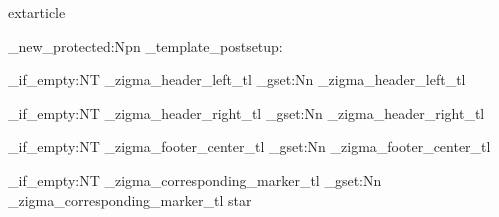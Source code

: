 
\ExplSyntaxOff


\def\@tempa{extarticle}
\ifx\zigma@baseclass\@tempa
  \def\zigma@baseclass{article}
\fi

\def\@tempa{1.25cm}
\ifx\zigma@marginleft\@tempa
  \def\zigma@marginleft{0.8in}
  \def\zigma@marginright{0.8in}
  \def\zigma@margintop{0.8in}
  \def\zigma@marginbottom{0.8in}
\fi

\ifx\zigma@bibpreset\@empty
  \def\zigma@bibpreset{nature}
\fi

\ExplSyntaxOn


\cs_new_protected:Npn \zigma_template_postsetup:
  {
    \tl_if_empty:NT \g_zigma_header_left_tl
      {
        \tl_gset:Nn \g_zigma_header_left_tl { }
      }
    
    \tl_if_empty:NT \g_zigma_header_right_tl
      {
        \tl_gset:Nn \g_zigma_header_right_tl { }
      }
    
    \tl_if_empty:NT \g_zigma_footer_center_tl
      {
        \tl_gset:Nn \g_zigma_footer_center_tl { \thepage }
      }
    
    \tl_if_empty:NT \g_zigma_corresponding_marker_tl
      {
        \tl_gset:Nn \g_zigma_corresponding_marker_tl { star }
      }
  }

\ExplSyntaxOff

